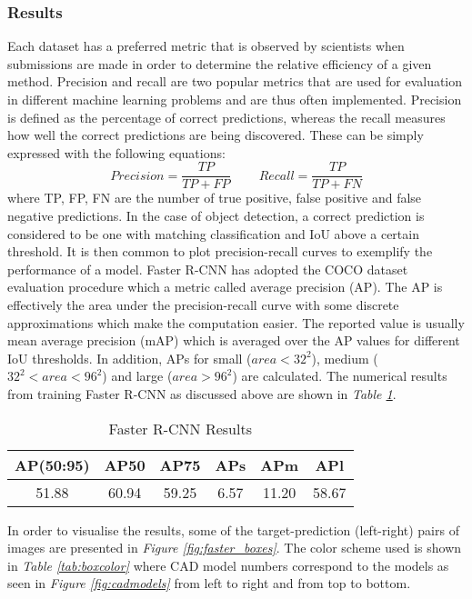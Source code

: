 \documentclass[main.tex]{subfiles}
\begin{document}
\subsubsection{Results}
Each dataset has a preferred metric that is observed by scientists when submissions are made in order to determine the relative efficiency of a given method. Precision and recall are two popular metrics that are used for evaluation in different machine learning problems and are thus often implemented. Precision is defined as the percentage of correct predictions, whereas the recall measures how well the correct predictions are being discovered. These can be simply expressed with the following equations:
\begin{equation}
Precision = \frac{TP}{TP + FP} \;\;\;\;\;\;\;\; Recall = \frac{TP}{TP + FN}
\end{equation}
where TP, FP, FN are the number of true positive, false positive and false negative predictions. In the case of object detection, a correct prediction is considered to be one with matching classification and IoU above a certain threshold. It is then common to plot precision-recall curves to exemplify the performance of a model. Faster R-CNN has adopted the COCO dataset evaluation procedure which a metric called average precision (AP). The AP is effectively the area under the precision-recall curve with some discrete approximations which make the computation easier. The reported value is usually mean average precision (mAP) which is  averaged over the AP values for different IoU thresholds. In addition, APs for small ($area < 32^2$), medium ($32^2 < area < 96^2$) and large ($area > 96^2$) are calculated. The numerical results from training Faster R-CNN as discussed above are shown in \emph{Table \ref{tab:results_faster}}.
\begin{table}[H]
	\centering
	\begin{tabular}{| c | c | c | c | c | c |}
		\hline 
  		AP(50:95) & AP50 & AP75 & APs & APm & APl  \\
  		\hline
   		51.88 & 60.94 & 59.25 & 6.57 & 11.20 & 58.67 \\
		\hline
	\end{tabular}	
\caption{Faster R-CNN Results}
\label{tab:results_faster}
\end{table}
\indent In order to visualise the results, some of the target-prediction (left-right) pairs of images are presented in \emph{Figure \ref{fig:faster_boxes}}. The color scheme used is shown in \emph{Table \ref{tab:boxcolor}} where CAD model numbers correspond to the models as seen in \emph{Figure \ref{fig:cadmodels}} from left to right and from top to bottom. 
\end{document}
